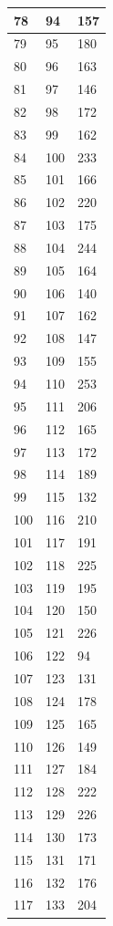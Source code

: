 \begin{tabular}{p{}p{}p{}}
\hline
78 & 94 & 157 \\
\hline
79 & 95 & 180 \\
\hline
80 & 96 & 163 \\
\hline
81 & 97 & 146 \\
\hline
82 & 98 & 172 \\
\hline
83 & 99 & 162 \\
\hline
84 & 100 & 233 \\
\hline
85 & 101 & 166 \\
\hline
86 & 102 & 220 \\
\hline
87 & 103 & 175 \\
\hline
88 & 104 & 244 \\
\hline
89 & 105 & 164 \\
\hline
90 & 106 & 140 \\
\hline
91 & 107 & 162 \\
\hline
92 & 108 & 147 \\
\hline
93 & 109 & 155 \\
\hline
94 & 110 & 253 \\
\hline
95 & 111 & 206 \\
\hline
96 & 112 & 165 \\
\hline
97 & 113 & 172 \\
\hline
98 & 114 & 189 \\
\hline
99 & 115 & 132 \\
\hline
100 & 116 & 210 \\
\hline
101 & 117 & 191 \\
\hline
102 & 118 & 225 \\
\hline
103 & 119 & 195 \\
\hline
104 & 120 & 150 \\
\hline
105 & 121 & 226 \\
\hline
106 & 122 & 94 \\
\hline
107 & 123 & 131 \\
\hline
108 & 124 & 178 \\
\hline
109 & 125 & 165 \\
\hline
110 & 126 & 149 \\
\hline
111 & 127 & 184 \\
\hline
112 & 128 & 222 \\
\hline
113 & 129 & 226 \\
\hline
114 & 130 & 173 \\
\hline
115 & 131 & 171 \\
\hline
116 & 132 & 176 \\
\hline
117 & 133 & 204 \\

\end{tabular}
